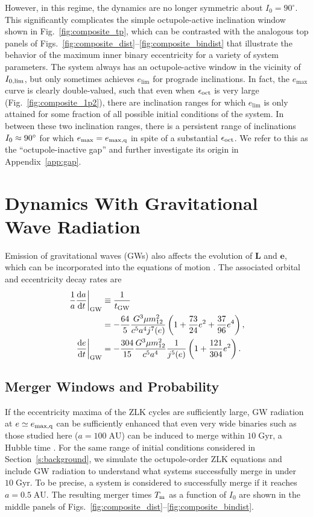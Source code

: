\documentclass[
        fleqn,
        usenatbib,
    ]{mnras}
\newcommand*{\rd}[2]{\frac{\mathrm{d}#1}{\mathrm{d}#2}}
\newcommand*{\at}[1]{\left.#1\right|}
\newcommand*{\p}[1]{\left(#1\right)}
\newcommand*{\bm}[1]{\mathbf{#1}}
\begin{document}
However, in this regime, the dynamics are no longer symmetric about $I_0 =
90^\circ$. This significantly complicates the simple octupole-active inclination
window shown in Fig.~\ref{fig:composite_tp}, which can be contrasted with the
analogous top panels of
Figs.~\ref{fig:composite_dist}--\ref{fig:composite_bindist} that illustrate the
behavior of the maximum inner binary eccentricity for a variety of system
parameters. The system always has an octupole-active window in the vicinity of
$I_{\rm 0, \lim}$, but only sometimes achieves $e_{\lim}$ for prograde
inclinations. In fact, the $e_{\max}$ curve is clearly double-valued, such that
even when $\epsilon_{\rm oct}$ is very large (Fig.~\ref{fig:composite_1p2}),
there are inclination ranges for which $e_{\lim}$ is only attained for some
fraction of all possible initial conditions of the system. In between these two
inclination ranges, there is a persistent range of inclinations $I_{\rm 0}
\approx 90^\circ$ for which $e_{\max} = e_{\rm \max, q}$ in spite of a substantial
$\epsilon_{\rm oct}$. We refer to this as the ``octupole-inactive gap'' and
further investigate its origin in Appendix~\ref{app:gap}.

\section{Dynamics With Gravitational Wave Radiation}\label{s:with_gw}

Emission of gravitational waves (GWs) also affects the evolution of $\bm{L}$ and
$\bm{e}$, which can be incorporated into the equations of motion
\citep{peters1964, ll18}. The associated orbital and eccentricity decay rates
are
\begin{align}
    \at{\frac{1}{a}\rd{a}{t}}_{\rm GW} &\equiv \frac{1}{t_{\rm GW}}\nonumber\\
        &= -\frac{64}{5}\frac{G^3 \mu m_{12}^2}{c^5a^4j^7(e)}
            \p{1 + \frac{73}{24}e^2 + \frac{37}{96}e^4}\label{eq:def_tgw},\\
    \at{\rd{e}{t}}_{\rm GW} &= -\frac{304}{15}\frac{G^3 \mu m_{12}^2}{c^5a^4}
        \frac{1}{j^{5}(e)}\p{1 + \frac{121}{304}e^2}\label{eq:dedt_gw}.
\end{align}

\subsection{Merger Windows and Probability}

If the eccentricity maxima of the ZLK cycles are sufficiently large, GW
radiation at $e \simeq e_{\rm \max, q}$ can be sufficiently enhanced that even very
wide binaries such as those studied here ($a = 100\;\mathrm{AU}$) can be induced
to merge within $10\;\mathrm{Gyr}$, a Hubble time \citep{ll18, LL19}. For the
same range of initial conditions considered in Section~\ref{s:background}, we
simulate the octupole-order ZLK equations and include GW radiation to understand
what systems successfully merge in under $10\;\mathrm{Gyr}$. To be precise, a
system is considered to successfully merge if it reaches $a = 0.5\;\mathrm{AU}$.
The resulting merger times $T_{\rm m}$ as a function of $I_0$ are shown in the
middle panels of Figs.~\ref{fig:composite_dist}--\ref{fig:composite_bindist}.
\end{document}
